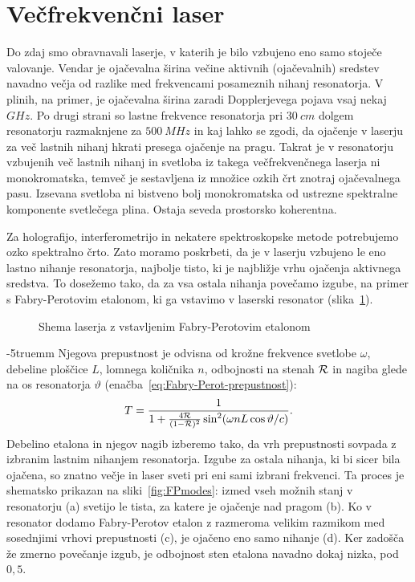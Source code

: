 \section{Večfrekvenčni laser}
Do zdaj smo obravnavali laserje, v katerih je bilo vzbujeno eno samo stoječe
valovanje. Vendar je ojačevalna širina večine aktivnih (ojačevalnih) sredstev 
navadno večja od razlike med frekvencami posameznih 
nihanj resonatorja. V plinih, na primer, je ojačevalna širina zaradi 
Dopplerjevega pojava vsaj nekaj $\si{GHz}$. Po drugi strani so lastne frekvence resonatorja 
pri $30~\si{cm}$ dolgem resonatorju razmaknjene za $500~\si{MHz}$ in kaj  
lahko se zgodi, da ojačenje v laserju za več lastnih nihanj hkrati 
presega ojačenje na pragu. Takrat je v resonatorju vzbujenih več lastnih nihanj in 
svetloba iz takega večfrekvenčnega laserja ni monokromatska,
temveč je sestavljena iz množice ozkih črt znotraj ojačevalnega pasu.
Izsevana svetloba ni bistveno bolj monokromatska od ustrezne spektralne 
komponente svetlečega plina. Ostaja seveda prostorsko koherentna.

Za holografijo, interferometrijo in nekatere spektroskopske metode
potrebujemo ozko spektralno črto. Zato moramo poskrbeti, da je v laserju vzbujeno le
eno lastno nihanje resonatorja, najbolje tisto, ki je najbližje vrhu ojačenja
aktivnega sredstva. To dosežemo tako, da za vsa ostala nihanja povečamo izgube,
na primer s Fabry-Perotovim etalonom, 
ki ga vstavimo v laserski resonator
(slika~\ref{fig:FPres}). 
\begin{figure}[ht]
\centering
\def\svgwidth{70truemm} 

\caption{Shema laserja z vstavljenim Fabry-Perotovim etalonom}
\label{fig:FPres}
\end{figure}
\vglue-5truemm
Njegova prepustnost je odvisna od krožne frekvence 
svetlobe $\omega$, debeline ploščice $L$, lomnega količnika $n$, odbojnosti na stenah 
${\cal R}$ in nagiba glede na os resonatorja $\vartheta$ (enačba~\ref{eq:Fabry-Perot-prepustnost}):
\begin{equation}
T=\frac{1}{1+\frac{4{\cal {R}}}{(1-{\cal {R}})^{2}}\sin^{2}
(\omega n L \cos \vartheta/c)}.
\label{5.22}
\end{equation}
Debelino etalona in njegov nagib 
izberemo tako, da vrh prepustnosti sovpada z izbranim lastnim nihanjem resonatorja. 
Izgube za ostala nihanja, ki bi sicer bila ojačena, so znatno večje in laser
sveti pri eni sami izbrani frekvenci. Ta proces je shematsko prikazan na 
sliki~\ref{fig:FPmodes}: izmed vseh možnih stanj v resonatorju (a) svetijo le tista, za katere
je ojačenje nad pragom (b). Ko v resonator dodamo Fabry-Perotov etalon z razmeroma velikim
razmikom med sosednjimi vrhovi prepustnosti (c), je ojačeno eno samo nihanje (d). 
Ker zadošča že zmerno povečanje izgub, je odbojnost sten etalona navadno dokaj nizka, 
pod $0,5$. 

